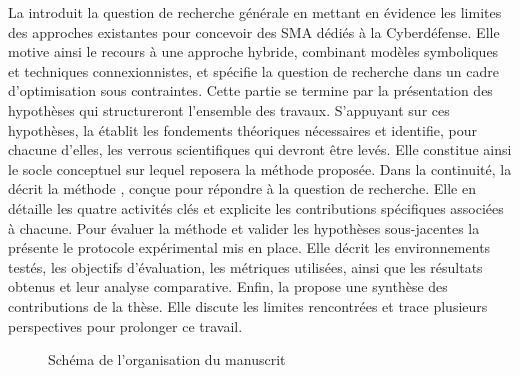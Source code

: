 \noindent
La  introduit la question de recherche générale en mettant en évidence les limites des approches existantes pour concevoir des SMA dédiés à la Cyberdéfense. Elle motive ainsi le recours à une approche hybride, combinant modèles symboliques et techniques connexionnistes, et spécifie la question de recherche dans un cadre d'optimisation sous contraintes. Cette partie se termine par la présentation des hypothèses qui structureront l'ensemble des travaux.
%
S'appuyant sur ces hypothèses, la  établit les fondements théoriques nécessaires et identifie, pour chacune d'elles, les verrous scientifiques qui devront être levés. Elle constitue ainsi le socle conceptuel sur lequel reposera la méthode proposée.
%
Dans la continuité, la  décrit la méthode , conçue pour répondre à la question de recherche. Elle en détaille les quatre activités clés et explicite les contributions spécifiques associées à chacune.
%
Pour évaluer la méthode et valider les hypothèses sous-jacentes la  présente le protocole expérimental mis en place. Elle décrit les environnements testés, les objectifs d'évaluation, les métriques utilisées, ainsi que les résultats obtenus et leur analyse comparative.
%
Enfin, la  propose une synthèse des contributions de la thèse. Elle discute les limites rencontrées et trace plusieurs perspectives pour prolonger ce travail.

\begin{figure}[h!]
  \centering
  \resizebox{\textwidth}{!}{%
    
  }
  \caption{Schéma de l'organisation du manuscrit}
  \label{fig:organisation_manuscrit}
\end{figure}

\cleardoublepage
